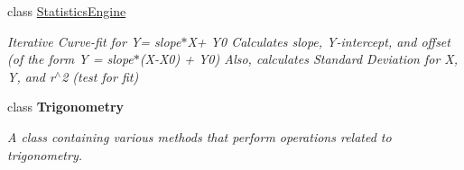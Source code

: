 \begin{DoxyCompactItemize}
class \mbox{\hyperlink{class_c_s_i_1_1_library_1_1_math_utilities_1_1_statistics_engine}{Statistics\+Engine}}
\begin{DoxyCompactList}\small\item\em Iterative Curve-\/fit for Y= slope$\ast$\+X+ Y0 Calculates slope, Y-\/intercept, and offset (of the form Y = slope$\ast$(X-\/\+X0) + Y0) Also, calculates Standard Deviation for X, Y, and r$^\wedge$2 (test for fit) \end{DoxyCompactList}\item 
class {\bfseries Trigonometry}
\begin{DoxyCompactList}\small\item\em A class containing various methods that perform operations related to trigonometry. \end{DoxyCompactList}\end{DoxyCompactItemize}
